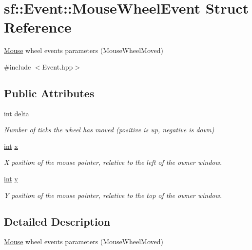 \hypertarget{structsf_1_1_event_1_1_mouse_wheel_event}{\section{sf\-:\-:Event\-:\-:Mouse\-Wheel\-Event Struct Reference}
\label{structsf_1_1_event_1_1_mouse_wheel_event}
}


\hyperlink{classsf_1_1_mouse}{Mouse} wheel events parameters (Mouse\-Wheel\-Moved)  




{\ttfamily \#include $<$Event.\-hpp$>$}

\subsection*{Public Attributes}
\begin{DoxyCompactItemize}
\item 
\hyperlink{term__entry_8h_ad65b480f8c8270356b45a9890f6499ae}{int} \hyperlink{structsf_1_1_event_1_1_mouse_wheel_event_a4d02b524b5530c7863e7b0f211fa522c}{delta}
\begin{DoxyCompactList}\small\item\em Number of ticks the wheel has moved (positive is up, negative is down) \end{DoxyCompactList}\item 
\hyperlink{term__entry_8h_ad65b480f8c8270356b45a9890f6499ae}{int} \hyperlink{structsf_1_1_event_1_1_mouse_wheel_event_a3079803f836ed7208f43b60332ab053e}{x}
\begin{DoxyCompactList}\small\item\em X position of the mouse pointer, relative to the left of the owner window. \end{DoxyCompactList}\item 
\hyperlink{term__entry_8h_ad65b480f8c8270356b45a9890f6499ae}{int} \hyperlink{structsf_1_1_event_1_1_mouse_wheel_event_a7ea1b8d8c28e2f530c6e9e6d9a5d32d3}{y}
\begin{DoxyCompactList}\small\item\em Y position of the mouse pointer, relative to the top of the owner window. \end{DoxyCompactList}\end{DoxyCompactItemize}


\subsection{Detailed Description}
\hyperlink{classsf_1_1_mouse}{Mouse} wheel events parameters (Mouse\-Wheel\-Moved) 

